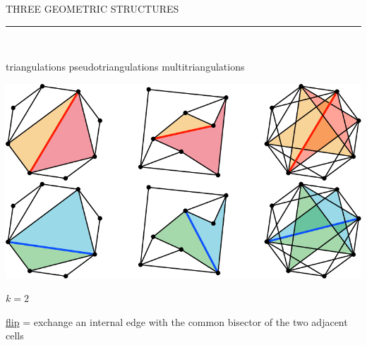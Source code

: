 \documentclass[12pt,titlepage,landscape,a4paper]{article}
\newcommand{\textemoyen}{\fontsize{23}{27}\selectfont}
\newenvironment{slide}[1]
{
\newpage
\begin{center}
{\blue \textemoyen \uppercase{#1}}\\
\end{center}
\vspace{-1cm}
\rule{\textwidth}{0.5 pt}\\
\vspace{-.8cm}
}
{\vspace*{-3cm}}
\newcommand{\blue}{\color{blue}} %
\renewcommand{\emph}[1]{\uline{#1}}
\begin{document}
\begin{slide}{Three geometric structures}

\hspace{1.6cm} triangulations \hspace{3.4cm} pseudotriangulations \hspace{2.5cm} multitriangulations\\
\begin{center}\includegraphics[scale=1.9]{geometricStructures3}\end{center}
\vspace{-8cm} \hspace*{25.7cm} ${k=2}$

\vspace{7cm}
\begin{center}
\emph{flip} = exchange an internal edge with the common bisector of the two adjacent cells
\end{center}

\end{slide}

\end{document}
